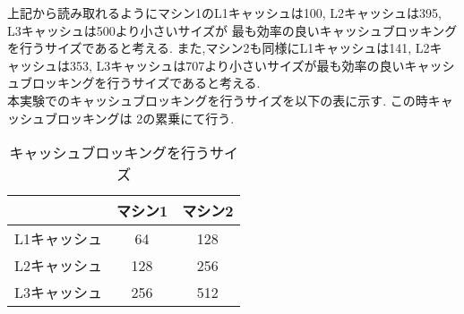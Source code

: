 \documentclass[11pt,a4paper]{jsreport}
\theoremstyle{definition}
\begin{document}
上記から読み取れるようにマシン1のL1キャッシュは100, L2キャッシュは395, L3キャッシュは500より小さいサイズが
最も効率の良いキャッシュブロッキングを行うサイズであると考える. また,マシン2も同様にL1キャッシュは141, L2キ
ャッシュは353, L3キャッシュは707より小さいサイズが最も効率の良いキャッシュブロッキングを行うサイズであると考える. \\
\indent	本実験でのキャッシュブロッキングを行うサイズを以下の表に示す. この時キャッシュブロッキングは
2の累乗にて行う.
\begin{table}[h]
\centering
\caption{キャッシュブロッキングを行うサイズ}
\begin{tabular}{|c|c|c|}
\hline
& マシン1 & マシン2 \\ \hline
L1キャッシュ & 64 & 128 \\ \hline
L2キャッシュ & 128 & 256 \\ \hline
L3キャッシュ & 256 & 512 \\ \hline
\end{tabular}
\end{table}
\end{document}
